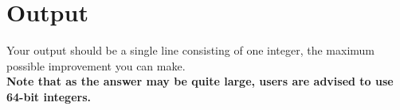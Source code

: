 \section*{Output}
{
\noindent Your output should be a single line consisting of one integer, the maximum possible improvement you can make.\\

\noindent \textbf{Note that as the answer may be quite large, users are advised to use 64-bit integers.}\\
}